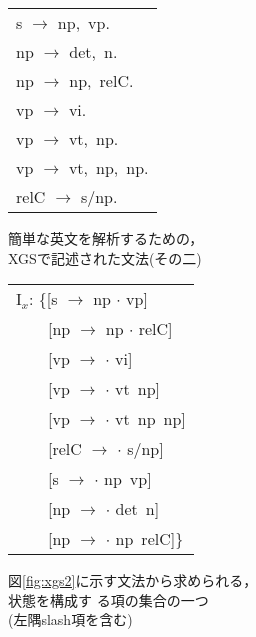 \begin{figure}[htbp]
  \begin{center}
  \begin{minipage}[b]{6cm}
    \begin{center}
      \begin{tabular}[h]{l}
        s $\to$ np,\ vp.\\
        np $\to$ det,\ n.\\
        np $\to$ np,\ relC.\\
        vp $\to$ vi.\\
        vp $\to$ vt,\ np.\\
        vp $\to$ vt,\ np,\ np.\\
        relC $\to$ s/np.
      \end{tabular}
      \caption{簡単な英文を解析するための，\\XGSで記述された文法(その二)\\}
      \label{fig:xgs2}
    \end{center}
  \end{minipage}
  \begin{minipage}[b]{6cm}
    \begin{center}
      {\small
        \begin{tabular}[h]{l}
          I$_{x}$: \{[s $\to$ np $\cdot$ vp] \\ 
          　　[np $\to$ np $\cdot$ relC] \\
          　　[vp $\to$ $\cdot$ vi] \\ 
          　　[vp $\to$ $\cdot$ vt\ np] \\
          　　[vp $\to$ $\cdot$ vt\ np\ np] \\
          　　[relC $\to$ $\cdot$ s/np] \\
          　　[s $\to$ $\cdot$ np\ vp] \\ 
          　　[np $\to$ $\cdot$ det\ n] \\
          　　[np $\to$ $\cdot$ np\ relC]\}
        \end{tabular}
        }
      \caption{図\ref{fig:xgs2}に示す文法から求められる，\\状態を構成す
        る項の集合の一つ\\(左隅slash項を含む)}
      \label{fig:states4}
    \end{center}
  \end{minipage}
  \end{center}
\end{figure}

\newcommand{\deriv}{}

